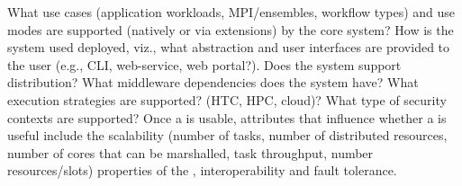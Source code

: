\documentclass{sig-alternate}
\begin{document}
What use cases (application workloads, MPI/ensembles, workflow types)
and use modes are supported (natively or via extensions) by the core
\pilotjob system?  How is the \pilotjob system used deployed, viz.,
what abstraction and user interfaces are provided to the user (e.g.,
CLI, web-service, web portal?). Does the \pilotjob system support
distribution? What middleware dependencies does the \pilotjob system
have?  What execution strategies are supported? (HTC, HPC, cloud)?
What type of security contexts are supported?  Once a \pilotjob is
usable, attributes that influence whether a \pilotjob is useful include
the scalability (number of tasks, number of distributed resources,
number of cores that can be marshalled, task throughput, number
resources/slots) properties of the \pilotjob, interoperability and
fault tolerance.





\end{document}
